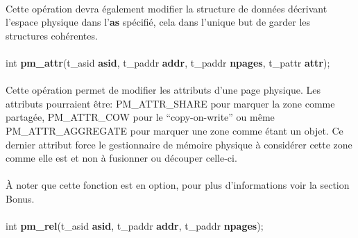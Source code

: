 \documentclass[10pt,a4wide]{article}
\begin{document}
\paragraph{}

Cette op\'eration devra \'egalement modifier la structure de donn\'ees
d\'ecrivant l'espace physique dans l'\textbf{as} sp\'ecifi\'e, cela
dans l'unique but de garder les structures coh\'erentes.

\paragraph{}

\hspace{1.5cm}int \textbf{pm\_attr}(t\_asid \textbf{asid},
                                    t\_paddr \textbf{addr},
                                    t\_paddr \textbf{npages},
                                    t\_pattr \textbf{attr});

\paragraph{}

Cette op\'eration permet de modifier les attributs d'une page physique.
Les attributs pourraient \^etre: PM\_ATTR\_SHARE pour marquer la zone
comme partag\'ee, PM\_ATTR\_COW pour le ``copy-on-write'' ou m\^eme
PM\_ATTR\_AGGREGATE pour marquer une zone comme \'etant un objet. Ce dernier
attribut force le gestionnaire de m\'emoire physique \`a consid\'erer
cette zone comme elle est et non \`a fusionner ou d\'ecouper celle-ci.

\paragraph{}

\`A noter que cette fonction est en option, pour plus d'informations voir
la section Bonus.

\paragraph{}

\hspace{1.5cm}int \textbf{pm\_rel}(t\_asid \textbf{asid},
                                   t\_paddr \textbf{addr},
                                   t\_paddr \textbf{npages});

\paragraph{}
\end{document}
